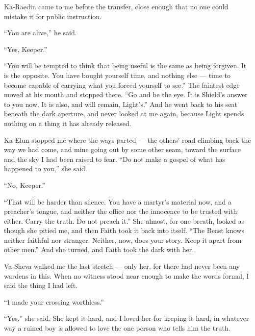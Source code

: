 Ka-Raedin came to me before the transfer, close enough that no one could mistake it for public instruction.\par

``You are alive,'' he said.\par

``Yes, Keeper.''\par

``You will be tempted to think that being useful is the same as being forgiven. It is the opposite. You have bought yourself time, and nothing else --- time to become capable of carrying what you forced yourself to see.'' The faintest edge moved at his mouth and stopped there. ``Go and be the eye. It is Shield's answer to you now. It is also, and will remain, Light's.'' And he went back to his seat beneath the dark aperture, and never looked at me again, because Light spends nothing on a thing it has already released.\par

Ka-Elun stopped me where the ways parted --- the others' road climbing back the way we had come, and mine going out by some other seam, toward the surface and the sky I had been raised to fear. ``Do not make a gospel of what has happened to you,'' she said.\par

``No, Keeper.''\par

``That will be harder than silence. You have a martyr's material now, and a preacher's tongue, and neither the office nor the innocence to be trusted with either. Carry the truth. Do not preach it.'' She almost, for one breath, looked as though she pitied me, and then Faith took it back into itself. ``The Beast knows neither faithful nor stranger. Neither, now, does your story. Keep it apart from other men.'' And she turned, and Faith took the dark with her.\par

Va-Sheva walked me the last stretch --- only her, for there had never been any wardens in this. When no witness stood near enough to make the words formal, I said the thing I had left.\par

``I made your crossing worthless.''\par

``Yes,'' she said. She kept it hard, and I loved her for keeping it hard, in whatever way a ruined boy is allowed to love the one person who tells him the truth.\par

